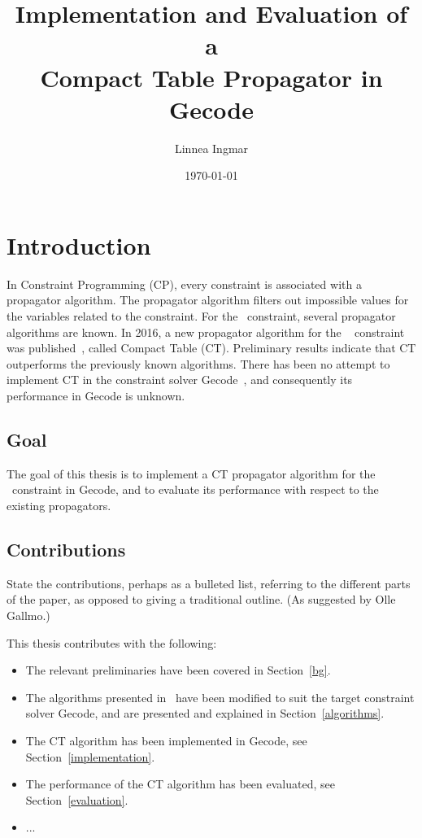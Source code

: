 \documentclass[a4paper,11pt]{article}
\title{\textbf{Implementation and Evaluation of a\\
    Compact Table Propagator in Gecode
  }
}
\author{Linnea Ingmar} %
\date{\today}
\newcommand{\Todo}[1]{{\color{blue}#1}}
\newcommand{\Chapref}[1]{Section~\ref{#1}}
\newcommand{\Table}{\Constraint{Table}~}
\newcommand{\CTpaper}[0]{DBLP:conf/cp/DemeulenaereHLP16}
\numberwithin{equation}{section}
\begin{document}
\maketitle

\tableofcontents

\newpage

\section{Introduction}
\label{intro}

In Constraint Programming (CP), every constraint is associated with a propagator
algorithm. The propagator algorithm filters out impossible values for the variables
related to the constraint. For the \Table constraint, several propagator
algorithms are known. In 2016, a new propagator algorithm for the \Table
constraint was published~\cite{\CTpaper}, called Compact Table (CT).
Preliminary results indicate that CT outperforms the previously known algorithms.
There has been no attempt to implement CT in the constraint solver Gecode~\cite{Gecode}, and consequently its performance in Gecode is unknown.

\subsection{Goal}
\label{intro:goal}
The goal of this thesis is to implement a CT propagator
algorithm for the \Table constraint in Gecode,
and to evaluate its performance with respect to the existing propagators.

\subsection{Contributions}
\label{intro:contributions}

\Todo{State the contributions, perhaps as a bulleted list, referring to the different
parts of the paper, as opposed to giving a traditional outline. (As suggested
by Olle Gallmo.)}

This thesis contributes with the following:

\begin{itemize}
  \item The relevant preliminaries have been covered in \Chapref{bg}.
  \item The algorithms presented in~\cite{DBLP:conf/cp/DemeulenaereHLP16} have been modified to suit the
    target constraint solver Gecode, and are presented and explained in 
    \Chapref{algorithms}.
  \item The CT algorithm has been implemented in Gecode, see \Chapref{implementation}.
  \item The performance of the CT algorithm has been evaluated, see \Chapref{evaluation}.
  \item ...
\end{itemize}
\end{document}
